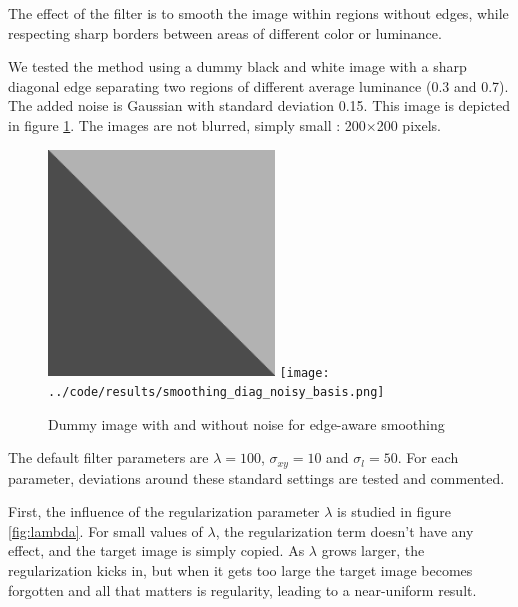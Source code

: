 \documentclass{article}
\begin{document}
The effect of the filter is to smooth the image within regions without edges, while respecting sharp borders between areas of different color or luminance.

\medskip

We tested the method using a dummy black and white image with a sharp diagonal edge separating two regions of different average luminance (0.3 and 0.7). The added noise is Gaussian with standard deviation 0.15. This image is depicted in figure \ref{fig:dummy}. The images are not blurred, simply small : 200$\times$200 pixels.

\begin{figure}
    \centering
    \includegraphics[width=6cm]{../code/results/smoothing_diag_basis.png}
    \hspace{1cm}
    \texttt{[image: ../code/results/smoothing\_diag\_noisy\_basis.png]}
    \caption{Dummy image with and without noise for edge-aware smoothing}
    \label{fig:dummy}
\end{figure}

The default filter parameters are $\lambda = 100$, $\sigma_{xy} = 10$ and $\sigma_l = 50$. For each parameter, deviations around these standard settings are tested and commented.

\medskip

First, the influence of the regularization parameter $\lambda$ is studied in figure \ref{fig:lambda}. For small values of $\lambda$, the regularization term doesn't have any effect, and the target image is simply copied. As $\lambda$ grows larger, the regularization kicks in, but when it gets too large the target image becomes forgotten and all that matters is regularity, leading to a near-uniform result.
\end{document}
